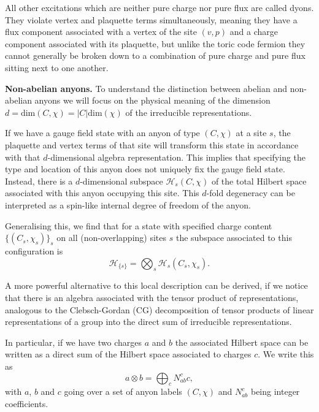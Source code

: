 \documentclass[a4paper,twocolumn,11pt]{quantumarticle}
\begin{document}
All other excitations which are neither pure charge nor pure flux are called dyons. They violate vertex and plaquette terms simultaneously, meaning they have a flux component associated with a vertex of the site $(v,p)$ and a charge component associated with its plaquette, but unlike the toric code fermion they cannot generally be broken down to a combination of pure charge and pure flux sitting next to one another.

\textbf{Non-abelian anyons.} To understand the distinction between abelian and non-abelian anyons we will focus on the physical meaning of the dimension $d = \text{dim}(C, \chi) = |C|\text{dim}(\chi)$ of the irreducible representations.

If we have a gauge field state with an anyon of type $(C, \chi)$ at a site $s$, the plaquette and vertex terms of that site will transform this state in accordance with that $d$-dimensional algebra representation. This implies that specifying the type and location of this anyon does not uniquely fix the gauge field state. Instead, there is a $d$-dimensional subspace $\mathcal H_s(C,\chi)$ of the total Hilbert space associated with this anyon occupying this site. This $d$-fold degeneracy can be interpreted as a spin-like internal degree of freedom of the anyon.

Generalising this, we find that for a state with specified charge content $\{(C_s, \chi_s)\}_s$ on all (non-overlapping) sites $s$ the subspace associated to this configuration is
\begin{equation}
	\mathcal{H}_{\{s\}} = \bigotimes_s \mathcal H_s (C_s, \chi_s).
\end{equation}

A more powerful alternative to this local description can be derived, if we notice that
there is an algebra associated with the tensor product of representations, analogous to the Clebsch-Gordan (CG) decomposition of tensor products of linear representations of a group into the direct sum of irreducible representations. 

In particular, if we have two charges $a$ and $b$ the associated Hilbert space can be written as a direct sum of the Hilbert space associated to charges $c$. We write this as 
\begin{equation}
	a \otimes b = \bigoplus_{c}N^c_{ab} c,\label{eqn:fuse} 
\end{equation}
with $a$, $b$ and $c$ going over a set of anyon labels $(C, \chi)$ and $N_{ab}^c$ being integer coefficients. 
\end{document}
